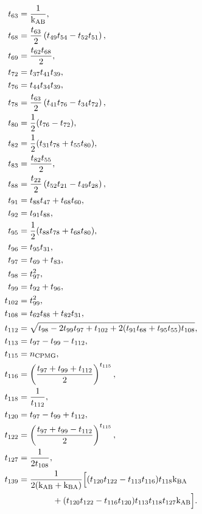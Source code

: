 \begin{subequations}
\begin{align}
     t_{63} &= \frac{1}{\textrm{k}_\textrm{AB}}, \\
     t_{68} &= \frac{t_{63}}{2} \left(t_{49} t_{54} - t_{52} t_{51} \right), \\
     t_{69} &= \frac{t_{62} t_{68}}{2}, \\
     t_{72} &= t_{37} t_{41} t_{39}, \\
     t_{76} &= t_{44} t_{34} t_{39}, \\
     t_{78} &= \frac{t_{63}}{2} \left(t_{41} t_{76} - t_{34} t_{72} \right), \\
     t_{80} &= \frac{1}{2} (t_{76} - t_{72}), \\
     t_{82} &= \frac{1}{2} (t_{31} t_{78} + t_{55} t_{80}), \\
     t_{83} &= \frac{t_{82} t_{55}}{2}, \\
     t_{88} &= \frac{t_{22}}{2} \left(t_{52} t_{21} - t_{49} t_{28} \right), \\
     t_{91} &= t_{88} t_{47} + t_{68} t_{60}, \\
     t_{92} &= t_{91} t_{88}, \\
     t_{95} &= \frac{1}{2} (t_{88} t_{78} + t_{68} t_{80}), \\
     t_{96} &= t_{95} t_{31}, \\
     t_{97} &= t_{69} + t_{83}, \\
     t_{98} &= t_{97}^2, \\
     t_{99} &= t_{92} + t_{96}, \\
    t_{102} &= t_{99}^2, \\
    t_{108} &= t_{62} t_{88} + t_{82} t_{31}, \\
    t_{112} &= \sqrt{t_{98} - 2 t_{99} t_{97} + t_{102} + 2 (t_{91} t_{68} + t_{95} t_{55}) t_{108}}, \\
    t_{113} &= t_{97} - t_{99} - t_{112}, \\
    t_{115} &= n_\textrm{CPMG}, \\
    t_{116} &= \left( \frac{t_{97} + t_{99} + t_{112}}{2} \right)^{t_{115}}, \\
    t_{118} &= \frac{1}{t_{112}}, \\
    t_{120} &= t_{97} - t_{99} + t_{112}, \\
    t_{122} &= \left( \frac{t_{97} + t_{99} - t_{112}}{2} \right)^{t_{115}}, \\
    t_{127} &= \frac{1}{2 t_{108}}, \\
    t_{139} &= \frac{1}{2(\textrm{k}_\textrm{AB} + \textrm{k}_\textrm{BA})} \Big[ (t_{120} t_{122} - t_{113} t_{116}) t_{118} \textrm{k}_\textrm{BA} \nonumber \\
            & \qquad \qquad                   + (t_{120} t_{122} - t_{116} t_{120}) t_{113} t_{118} t_{127} \textrm{k}_\textrm{AB} \Big].
\end{align}
\end{subequations}

